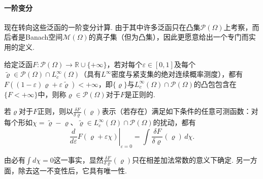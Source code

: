 \paragraph{一阶变分}
\label{idx:i62-p261}
现在转向这些泛函的一阶变分计算. 由于其中许多泛函只在凸集$\mathscr P(\Omega)$上考察，而后者是Banach空间$\mathscr M(\Omega)$的真子集（但为凸集），因此更愿意给出一个专门而实用的定义.
\begin{definition}\label{obj:7.12}
给定泛函$F:\mathscr P(\Omega)\to\mathbb R\cup\{+\infty\}$，若对每个$\varepsilon\in[0,1]$及每个$\widetilde\varrho\in\mathscr P(\Omega)\cap L_c^\infty(\Omega)$（具有$L^\infty$密度与紧支集的绝对连续概率测度），都有$F((1-\varepsilon)\varrho+\varepsilon\widetilde\varrho)<+\infty$，即$\{\varrho\}$与$L_c^\infty(\Omega)\cap\mathscr P(\Omega)$的凸包包含在$\{F<+\infty\}$中，则称$\varrho\in\mathscr P(\Omega)$对于$F$是正则的.

若$\varrho$对于$F$正则，则以$\frac{\delta F}{\delta\varrho}(\varrho)$表示（若存在）满足如下条件的任意可测函数：对每个形如$\chi=\widetilde\varrho-\varrho$、$\widetilde\varrho\in L_c^\infty(\Omega)\cap\mathscr P(\Omega)$的扰动，都有
\[
 \left.\frac d{d\varepsilon}F(\varrho+\varepsilon\chi)\right|_{\varepsilon=0}
             =\int\frac{\delta F}{\delta\varrho}(\varrho)\,d\chi.
\]
\end{definition}
\begin{remark}\label{obj:7.13}
由必有$\int d\chi=0$这一事实，显然$\frac{\delta F}{\delta\varrho}(\varrho)$只在相差加法常数的意义下确定. 另一方面，除去这一不变性后，它具有唯一性.
\end{remark}
